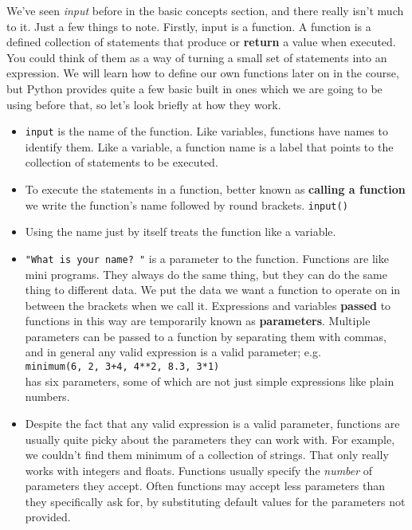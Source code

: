 We've seen \textit{input} before in the basic concepts section, and     there really isn't much to it. Just a few things to note.     Firstly, input is a function. A function is a defined collection of     statements that produce or \textbf{return} a value when     executed. You could think of them as a way of turning a small set of     statements into an expression. We will learn how to define our own     functions later on in the course, but Python provides quite a few basic     built in ones which we are going to be using before that, so let's look     briefly at how they work.
\begin{itemize}
	\item 
\texttt{input} is the name of the function. Like       variables, functions have names to identify them. Like a variable,       a function name is a label that points to the collection of       statements to be executed.
	\item To execute the statements in a function, better known as       \textbf{calling a function} we write the function's name       followed by round brackets. 
\texttt{input()}
	\item Using the name just by itself treats the function like a       variable. 
	\item 
\texttt{"What is your name? "} is a parameter to the       function. Functions are like mini programs. They always do the same       thing, but they can do the same thing to different data. We put the       data we want a function to operate on in between the brackets when       we call it. Expressions and variables \textbf{passed} to       functions in this way are temporarily known as       \textbf{parameters}. Multiple parameters can be passed to a       function by separating them with commas, and in general any valid       expression is a valid parameter; e.g.
\\
\texttt{minimum(6, 2,         3+4, 4**2, 8.3, 3*1)}
\\ has six parameters, some of which       are not just simple expressions like plain numbers.
	\item Despite the fact that any valid expression is a valid       parameter, functions are usually quite picky about the parameters       they can work with. For example, we couldn't find them minimum of a       collection of strings. That only really works with integers and       floats. Functions usually specify the \textit{number} of parameters       they accept. Often functions may accept less parameters than they       specifically ask for, by substituting default values for the       parameters not provided. 
\end{itemize}


